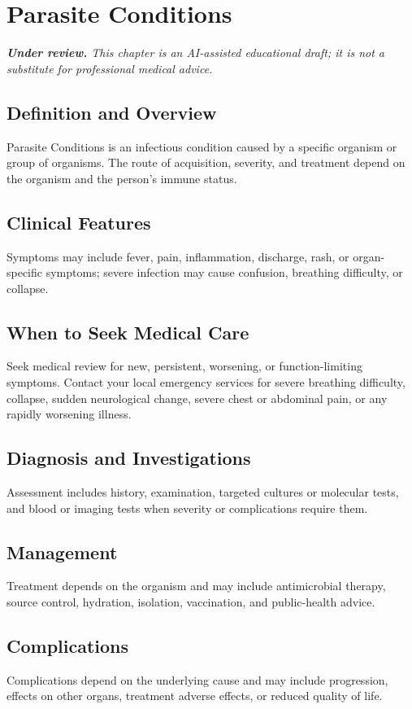 \chapter{Parasite Conditions}

\medskip
\noindent\textit{\textbf{Under review.} This chapter is an AI-assisted educational draft; it is not a substitute for professional medical advice.}

\section*{Definition and Overview}
Parasite Conditions is an infectious condition caused by a specific organism or group of organisms. The route of acquisition, severity, and treatment depend on the organism and the person's immune status.

\section*{Clinical Features}
Symptoms may include fever, pain, inflammation, discharge, rash, or organ-specific symptoms; severe infection may cause confusion, breathing difficulty, or collapse.

\section*{When to Seek Medical Care}
Seek medical review for new, persistent, worsening, or function-limiting symptoms. Contact your local emergency services for severe breathing difficulty, collapse, sudden neurological change, severe chest or abdominal pain, or any rapidly worsening illness.

\section*{Diagnosis and Investigations}
Assessment includes history, examination, targeted cultures or molecular tests, and blood or imaging tests when severity or complications require them.

\section*{Management}
Treatment depends on the organism and may include antimicrobial therapy, source control, hydration, isolation, vaccination, and public-health advice.

\section*{Complications}
Complications depend on the underlying cause and may include progression, effects on other organs, treatment adverse effects, or reduced quality of life.

